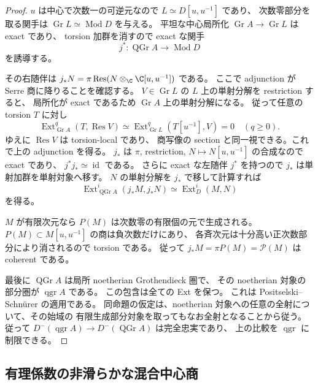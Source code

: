 \begin{proof}
$u$ は中心で次数一の可逆元なので $L\simeq D[u,u^{-1}]$ であり、
次数零部分を取る関手は $\operatorname{Gr}L\simeq\operatorname{Mod}D$ を与える。
平坦な中心局所化 $\operatorname{Gr}A\to\operatorname{Gr}L$ は exact であり、
torsion 加群を消すので exact な関手
\[
 j^*:\operatorname{QGr}A\longrightarrow\operatorname{Mod}D
\]
を誘導する。

その右随伴は
$j_*N=\pi\operatorname{Res}(N\otimes_\C\C[u,u^{-1}])$ である。
ここで adjunction が Serre 商に降りることを確認する。
$V\in\operatorname{Gr}L$ の $L$ 上の単射分解を restriction すると、
局所化が exact であるため $\operatorname{Gr}A$ 上の単射分解になる。
従って任意の torsion $T$ に対し
\[
 \operatorname{Ext}^q_{\operatorname{Gr}A}(T,\operatorname{Res}V)
 \simeq\operatorname{Ext}^q_{\operatorname{Gr}L}(T[u^{-1}],V)=0
 \quad(q\ge0).
\]
ゆえに $\operatorname{Res}V$ は torsion-local であり、
商写像の section と同一視できる。これで上の adjunction を得る。
$j_*$ は $\pi$, restriction, $N\mapsto N[u,u^{-1}]$ の合成なので exact であり、
$j^*j_*\simeq\operatorname{id}$ である。
さらに exact な左随伴 $j^*$ を持つので $j_*$ は単射加群を単射対象へ移す。
$N$ の単射分解を $j_*$ で移して計算すれば
\[
 \operatorname{Ext}^i_{\operatorname{QGr}A}(j_*M,j_*N)
 \simeq\operatorname{Ext}^i_D(M,N)
\]
を得る。

$M$ が有限次元なら $P(M)$ は次数零の有限個の元で生成される。
$P(M)\subset M[u,u^{-1}]$ の商は負次数だけにあり、
各斉次元は十分高い正次数部分により消されるので torsion である。
従って $j_*M=\pi P(M)=\mathcal P(M)$ は coherent である。

最後に $\operatorname{QGr}A$ は局所 noetherian Grothendieck 圏で、
その noetherian 対象の部分圏が $\operatorname{qgr}A$ である。
この包含は全ての Ext を保つ。
これは Positselski--Schn\"urer \cite[Proposition~2.1]{CMOSmallBig} の適用である。
同命題の仮定は、noetherian 対象への任意の全射について、その始域の
有限生成部分対象を取ってもなお全射となることから従う。
従って $D^-(\operatorname{qgr}A)\to D^-(\operatorname{QGr}A)$ は完全忠実であり、
上の比較を $\operatorname{qgr}$ に制限できる。
\end{proof}

\subsection{有理係数の非滑らかな混合中心商}

